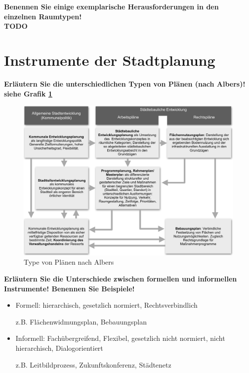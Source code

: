 \documentclass[]{article}
\newenvironment{question}{\vspace{8mm}\noindent\bfseries}{\\}
\begin{document}
\begin{question}
	Benennen Sie einige exemplarische Herausforderungen in den einzelnen Raumtypen!
\end{question}
TODO


\section{Instrumente der Stadtplanung}
\begin{question}
	Erläutern Sie die unterschiedlichen Typen von Plänen (nach Albers)!
\end{question}
siehe Grafik \ref{fig:typenvonplaenen}

\begin{figure}
	\centering
	\includegraphics[width=0.7\linewidth]{images/typen_von_plaenen}
	\caption{Type von Plänen nach Albers}
	\label{fig:typenvonplaenen}
\end{figure}



\begin{question}
	Erläutern Sie die Unterschiede zwischen formellen und informellen Instrumente! Benennen Sie Beispiele!
\end{question}

\begin{itemize}
	\item Formell: hierarchisch, gesetzlich normiert, Rechtsverbindlich
	
	z.B. Flächenwidmungsplan, Bebauungsplan
	
	\item Informell: Fachübergreifend, Flexibel, gesetzlich nicht normiert, nicht hierarchisch, Dialogorientiert
	
	z.B. Leitbildprozess, Zukunftskonferenz, Städtenetz
\end{itemize}
\end{document}
